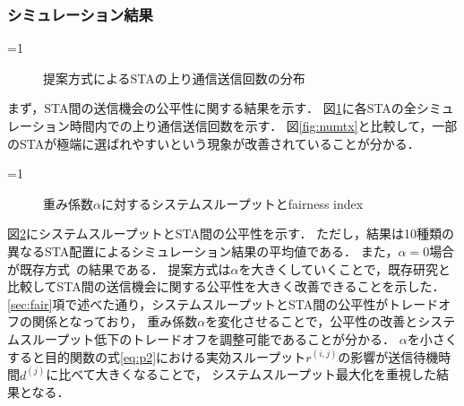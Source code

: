 \documentclass[technicalreport]{ieicej}
\newcounter{flagFig}
\newcommand{\sij}{(i,j)}
\newcommand{\rij}{r^{\sij}}
\begin{document}
		\subsubsection{シミュレーション結果}
			\ifnum\value{flagFig}=1 {\begin{figure}[t]
				\centering
					\caption{提案方式によるSTAの上り通信送信回数の分布}
					\label{fig:fair}
			\end{figure}}\fi
			まず，STA間の送信機会の公平性に関する結果を示す．
			図\ref{fig:fair}に各STAの全シミュレーション時間内での上り通信送信回数を示す．
			図\ref{fig:numtx}と比較して，一部のSTAが極端に選ばれやすいという現象が改善されていることが分かる．
			\par
			\ifnum\value{flagFig}=1 {\begin{figure}[t]
				\centering
					\caption{重み係数$\alpha$に対するシステムスループットとfairness index}
					\label{fig:thr_fair}
			\end{figure}}\fi
			図\ref{fig:thr_fair}にシステムスループットとSTA間の公平性を示す．
			ただし，結果は10種類の異なるSTA配置によるシミュレーション結果の平均値である．
			また，$\alpha=0$場合が既存方式~\cite{promac}の結果である．
			提案方式は$\alpha$を大きくしていくことで，既存研究と比較してSTA間の送信機会に関する公平性を大きく改善できることを示した．
			\ref{sec:fair}項で述べた通り，システムスループットとSTA間の公平性がトレードオフの関係となっており，
			重み係数$\alpha$を変化させることで，公平性の改善とシステムスループット低下のトレードオフを調整可能であることが分かる．
			$\alpha$を小さくすると目的関数の式\eqref{eq:p2}における実効スループット$\rij$の影響が送信待機時間$d^{(j)}$に比べて大きくなることで，
			システムスループット最大化を重視した結果となる．
\end{document}
